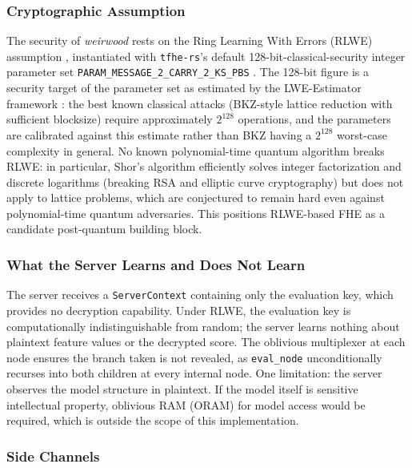 \documentclass[12pt]{article}
\begin{document}
\subsubsection*{Cryptographic Assumption}

The security of \textit{weirwood} rests on the Ring Learning With Errors (RLWE) assumption \cite{peikert,regev}, instantiated with \texttt{tfhe-rs}'s default 128-bit-classical-security integer parameter set \texttt{PARAM\_MESSAGE\_2\_CARRY\_2\_KS\_PBS} \cite{TFHE-rs}. The 128-bit figure is a security target of the parameter set as estimated by the LWE-Estimator framework \cite{albrecht-est}: the best known classical attacks (BKZ-style lattice reduction with sufficient blocksize) require approximately $2^{128}$ operations, and the parameters are calibrated against this estimate rather than BKZ having a $2^{128}$ worst-case complexity in general. No known polynomial-time quantum algorithm breaks RLWE: in particular, Shor's algorithm \cite{shor} efficiently solves integer factorization and discrete logarithms (breaking RSA and elliptic curve cryptography) but does not apply to lattice problems, which are conjectured to remain hard even against polynomial-time quantum adversaries. This positions RLWE-based FHE as a candidate post-quantum building block.

\subsubsection*{What the Server Learns and Does Not Learn}

The server receives a \texttt{ServerContext} containing only the evaluation key, which provides no decryption capability. Under RLWE, the evaluation key is computationally indistinguishable from random; the server learns nothing about plaintext feature values or the decrypted score. The oblivious multiplexer at each node ensures the branch taken is not revealed, as \texttt{eval\_node} unconditionally recurses into both children at every internal node. One limitation: the server observes the model structure in plaintext. If the model itself is sensitive intellectual property, oblivious RAM (ORAM) for model access would be required, which is outside the scope of this implementation.

\subsubsection*{Side Channels}
\end{document}

